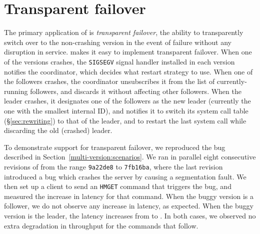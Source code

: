 \section{Transparent failover}
\label{sec:applications}


The primary application of \varan is \emph{transparent failover}, \ie the
ability to transparently switch over to the non-crashing version in the event
of failure without any disruption in service.  \varan makes it easy to
implement transparent failover.  When one of the versions crashes, the
\lstinline`SIGSEGV` signal handler installed in each version notifies the
coordinator, which decides what restart strategy to use.  When one of the
followers crashes, the coordinator unsubscribes it from the list of
currently-running followers, and discards it without affecting other followers.
When the leader crashes, it designates one of the followers as the new leader
(currently the one with the smallest internal ID), and notifies it to switch
its system call table (\S\ref{sec:rewriting}) to that of the leader, and to
restart the last system call while discarding the old (crashed) leader.


To demonstrate support for transparent failover, we reproduced the
\redis bug described in Section~\ref{multi-version:scenarios}.  We ran
in parallel eight consecutive revisions of \redis from the range
\lstinline`9a22de8` to \lstinline`7fb16ba`, where the last revision
introduced a bug which crashes the server by causing a segmentation
fault. We then set up a client to send an \lstinline`HMGET` command that
triggers the bug, and measured the increase in latency for that command.
When the buggy version is a follower, we do not observe any increase in
latency, as expected.  When the buggy version is the leader, the latency
increases from \redisnormallatency to \redisfailoverlatency.  In both
cases, we observed no extra degradation in throughput for the commands
that follow.

